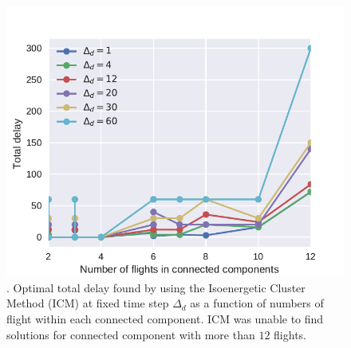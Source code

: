 \begin{figure}
  \includegraphics[width=\columnwidth]{pics/qubo_icm/qubo_icm_2.pdf}
  \caption{\label{fig:icm2}. Optimal total delay found by using the Isoenergetic
  Cluster Method (ICM) at fixed time step $\Delta_d$ as a function of numbers of
  flight within each connected component. ICM was unable to find solutions for connected
  component with more than $12$ flights.}
\end{figure}
